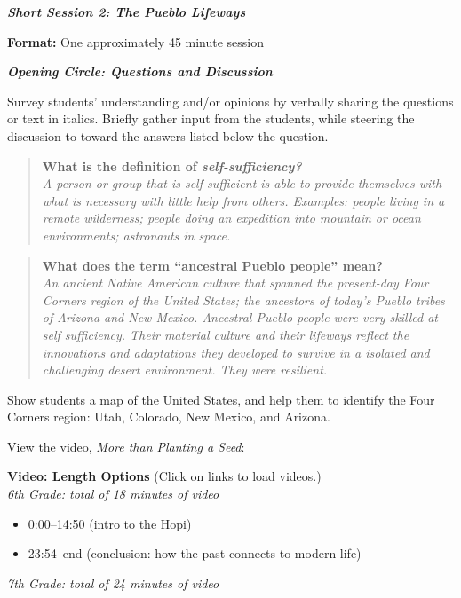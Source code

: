 \documentclass[12pt,]{article}
\providecommand{\tightlist}{%
  \setlength{\itemsep}{0pt}\setlength{\parskip}{0pt}}
\begin{document}
\textbf{\emph{Short Session 2: The Pueblo Lifeways}}

\textbf{Format:} One approximately 45 minute session

\textbf{\emph{Opening Circle: Questions and Discussion }}

Survey students' understanding and/or opinions by verbally sharing the
questions or text in italics. Briefly gather input from the students,
while steering the discussion to toward the answers listed below the
question.

\begin{quote}
\textbf{What is the definition of \emph{self-sufficiency?}}\\
\emph{A person or group that is self sufficient is able to provide
themselves with what is necessary with little help from others.
Examples: people living in a remote wilderness; people doing an
expedition into mountain or ocean environments; astronauts in space.}
\end{quote}

\begin{quote}
\textbf{What does the term ``ancestral Pueblo people'' mean?}\\
\emph{An ancient Native American culture that spanned the present-day Four
Corners region of the United States; the ancestors of today's Pueblo
tribes of Arizona and New Mexico. Ancestral Pueblo people were very
skilled at self sufficiency. Their material culture and their lifeways
reflect the innovations and adaptations they developed to survive in a
isolated and challenging desert environment. They were resilient.}
\end{quote}

Show students a map of the United States, and help them to identify the
Four Corners region: Utah, Colorado, New Mexico, and Arizona.

View the video, \emph{More than Planting a Seed}:

\textbf{Video: Length Options} (Click on links to load videos.)\\
\emph{6th Grade: total of 18 minutes of video}

\begin{itemize}
\tightlist
\item
  0:00--14:50 (intro to the Hopi)
\item
  23:54--end (conclusion: how the past connects to modern life)
\end{itemize}

\emph{7th Grade: total of 24 minutes of video}
\end{document}
